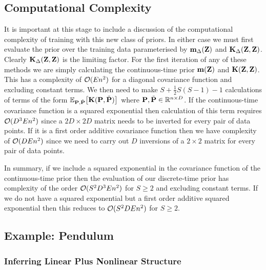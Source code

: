 \subsection{Computational Complexity}
It is important at this stage to include a discussion of the computational complexity of training with this new class of priors. In either case we must first evaluate the prior over the training data parameterised by $\mathbf{m}_{\Delta}(\mathbf{Z})$ and $\mathbf{K}_{\Delta}(\mathbf{Z},\mathbf{Z})$. Clearly $\mathbf{K}_{\Delta}(\mathbf{Z},\mathbf{Z})$ is the limiting factor. For the first iteration of any of these methods we are simply calculating the continuous-time prior $\mathbf{m}(\mathbf{Z})$ and $\mathbf{K}(\mathbf{Z},\mathbf{Z})$. This has a complexity of $\mathcal{O}(En^2)$ for a diagonal covariance function and excluding constant terms. We then need to make $S+\tfrac{1}{2}S(S-1) - 1$ calculations of terms of the form $\mathbb{E}_{\mathbf{P},\tilde{\mathbf{P}}}\big[\mathbf{K}(\mathbf{P},\tilde{\mathbf{P}})\big]$ where $\mathbf{P}, \tilde{\mathbf{P}} \in \mathbb{R}^{n \times D}$. If the continuous-time covariance function is a squared exponential then calculation of this term requires $\mathcal{O}(D^3En^2)$ since a $2D \times 2D$ matrix needs to be inverted for every pair of data points. If it is a first order additive covariance function then we have complexity of $\mathcal{O}(DEn^2)$ since we need to carry out $D$ inversions of a $2 \times 2$ matrix for every pair of data points.

In summary, if we include a squared exponential in the covariance function of the continuous-time prior then the evaluation of our discrete-time prior has complexity of the order $\mathcal{O}(S^2D^3En^2)$ for $S\geq2$ and excluding constant terms. If we do not have a squared exponential but a first order additive squared exponential then this reduces to $\mathcal{O}(S^2DEn^2)$ for $S\geq2$.















\subsection{Example: Pendulum} \label{sec:pendulum2}
\subsubsection{Inferring Linear Plus Nonlinear Structure}





